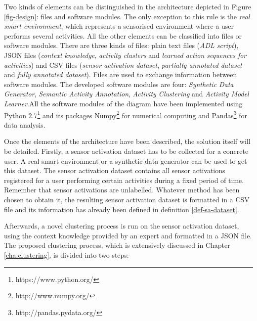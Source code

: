 Two kinds of elements can be distinguished in the architecture depicted in Figure \ref{fig-design}: files and software modules. The only exception to this rule is the \textit{real smart environment}, which represents a sensorised environment where a user performs several activities. All the other elements can be classified into files or software modules. There are three kinds of files: plain text files (\textit{ADL script}), JSON files (\textit{context knowledge}, \textit{activity clusters} and \textit{learned action sequences for activities}) and CSV files (\textit{sensor activation dataset}, \textit{partially annotated dataset} and \textit{fully annotated dataset}). Files are used to exchange information between software modules. The developed software modules are four: \textit{Synthetic Data Generator}, \textit{Semantic Activity Annotation}, \textit{Activity Clustering} and \textit{Activity Model Learner}.All the software modules of the diagram have been implemented using Python 2.7\footnote{https://www.python.org/} and its packages Numpy\footnote{http://www.numpy.org/} for numerical computing and Pandas\footnote{http://pandas.pydata.org/} for data analysis. 

Once the elements of the architecture have been described, the solution itself will be detailed. Firstly, a sensor activation dataset has to be collected for a concrete user. A real smart environment or a synthetic data generator can be used to get this dataset. The sensor activation dataset contains all sensor activations registered for a user performing certain activities during a fixed period of time. Remember that sensor activations are unlabelled. Whatever method has been chosen to obtain it, the resulting sensor activation dataset is formatted in a CSV file and its information has already been defined in definition \ref{def-sa-dataset}.

Afterwards, a novel clustering process is run on the sensor activation dataset, using the context knowledge provided by an expert and formatted in a JSON file. The proposed clustering process, which is extensively discussed in Chapter \ref{cha:clustering}, is divided into two steps: 

